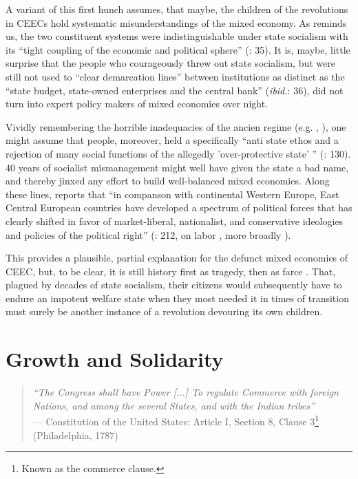 \documentclass[11pt,a4paper,oneside,openright]{article}
\begin{document}
A variant of this first hunch assumes, that maybe, the children of the revolutions in \glspl{CEEC} hold systematic misunderstandings of the mixed economy. As \citeauthor{Bonker2006} reminds us, the two constituent systems were indistinguishable under state socialism with its ``tight coupling of the economic and political sphere'' (\citeyear{Bonker2006}: 35). It is, maybe, little surprise that the people who courageously threw out state socialism, but were still not used to ``clear demarcation lines'' between institutions as distinct as the ``state budget, state-owned enterprises and the central bank'' (\emph{ibid.}: 36), did not turn into expert policy makers of mixed economies over night.

Vividly remembering the horrible inadequacies of the ancien regime (e.g. \citealt{Szikra2009}, \citealt{Millard1992}), one might assume that people, moreover, held a specifically  ``anti state ethos and a rejection of many social functions of the allegedly 'over-protective state' '' (\citealt{Millard1992}: 130). 40 years of socialist mismanagement might well have given the state a bad name, and thereby jinxed any effort to build well-balanced mixed economies. Along these lines, \citeauthor{Inglot2008} reports that ``in companson with continental Western Europe, East Central European countries have developed a spectrum of political forces that has clearly shifted in favor of market-liberal, nationalist, and conservative ideologies and policies of the political right'' (\citeyear{Inglot2008}: 212, on labor \citealt{Crowley2002}, more broadly \citealt{OrenOuto2001}).

This provides a plausible, partial explanation for the defunct mixed economies of \gls{CEEC}, but, to be clear, it is still history first as tragedy, then as farce \citep{Marx1852}. That, plagued by decades of state socialism, their citizens would subsequently have to endure an impotent welfare state when they most needed it in times of transition must surely be another instance of a revolution devouring its own children.

\section{Growth and Solidarity} \label{sec:growth_solidarity}

\begin{quote}
	\emph{``The Congress shall have Power [...] To regulate Commerce with foreign Nations, and among the several States, and with the Indian tribes''}\\
	--- Constitution of the United States: Article I, Section 8, Clause 3\footnote{
		Known as the commerce clause.} 
	(Philadelphia, 1787)
\end{quote}
\end{document}
